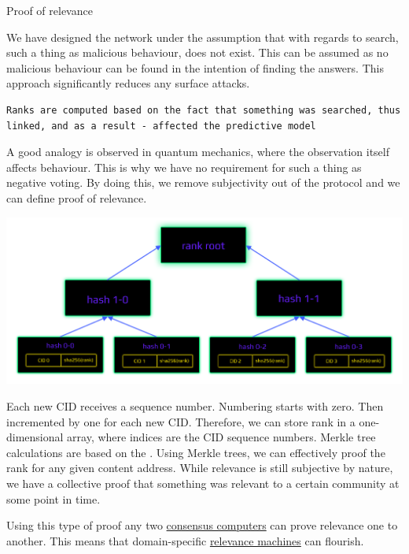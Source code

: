 \documentclass[8pt,oneside]{amsart}
\makeatletter
\newcommand{\linkgreen}[2]{\href{#1}{\color{green}{#2}}}
\renewcommand\subsection{\@startsection{subsection}
                                    {2}{\z@}
                                    {-3.25ex\@plus -1ex \@minus -.2ex}
                                    {0ex \@plus .2ex}
                                    {\play\Large}
                        }
\newcommand{\titleSection}[1]{\subsection{#1}}
\newenvironment{Figure}
  {\par\medskip\noindent\minipage{\linewidth}}
  {\endminipage\par\medskip}
\makeatother
\begin{document}
\titleSection{Proof of relevance}\label{proof-of-relevance}

We have designed the network under the assumption that with regards to search, such a thing as malicious behaviour, does not exist. This can be assumed as no malicious behaviour can be found in the intention of finding the answers. This approach significantly reduces any surface attacks.

\begin{lstlisting}
Ranks are computed based on the fact that something was searched, thus linked, and as a result - affected the predictive model
\end{lstlisting}

A good analogy is observed in quantum mechanics, where the observation itself affects behaviour. This is why we have no requirement for such a thing as negative voting. By doing this, we remove subjectivity out of the protocol and we can define proof of relevance.

\begin{Figure}
    \centering
    \includegraphics[width=1\textwidth]{rank-tree.png}
\end{Figure}

Each new CID receives a sequence number. Numbering starts with zero. Then incremented by one for each new CID. Therefore, we can store rank in a one-dimensional array, where indices are the CID sequence numbers. Merkle tree calculations are based on the \linkgreen{https://ipfs.io/ipfs/QmZpJLmc3T2L1FLUxzvU3P8MBCPe15fEmUyVS7Bz8ZKMhG}{RFC-6962 standard}. Using Merkle trees, we can effectively proof the rank for any given content address. While relevance is still subjective by nature, we have a collective proof that something was relevant to a certain community at some point in time.

Using this type of proof any two \linkgreen{https://ipfs.io/ipfs/QmSGbrGAPZtR6Q1jHHe8mmS3bLBehKmfp9ZYvrg5ycaZuk}{IBC compatible} {\hyperref[consensus-computer]{consensus computers}} can prove relevance one to another. This means that domain-specific {\hyperref[relevance-machine]{relevance machines}} can flourish.
\end{document}
